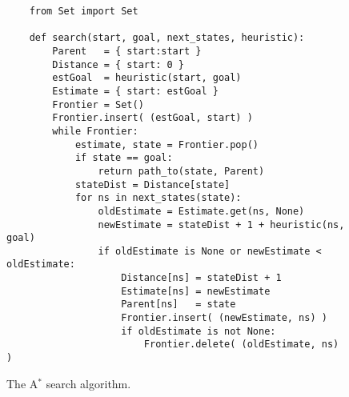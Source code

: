 \begin{figure}[!ht]
\centering
\begin{verbatim}
    from Set import Set

    def search(start, goal, next_states, heuristic):
        Parent   = { start:start }
        Distance = { start: 0 }           
        estGoal  = heuristic(start, goal)
        Estimate = { start: estGoal }
        Frontier = Set()
        Frontier.insert( (estGoal, start) )
        while Frontier:
            estimate, state = Frontier.pop()
            if state == goal:
                return path_to(state, Parent)
            stateDist = Distance[state]
            for ns in next_states(state):
                oldEstimate = Estimate.get(ns, None)
                newEstimate = stateDist + 1 + heuristic(ns, goal)
                if oldEstimate is None or newEstimate < oldEstimate:
                    Distance[ns] = stateDist + 1
                    Estimate[ns] = newEstimate
                    Parent[ns]   = state
                    Frontier.insert( (newEstimate, ns) )
                    if oldEstimate is not None:
                        Frontier.delete( (oldEstimate, ns) )
\end{verbatim}
\vspace*{-0.3cm}
\caption{The A$^*$ search algorithm.}
\label{fig:A-Star-Search.ipynb}
\end{figure}

